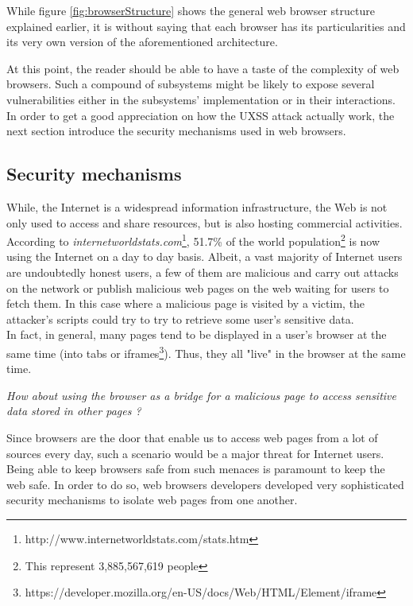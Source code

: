 \documentclass[journal]{IEEEtran}
\begin{document}
While figure \ref{fig:browserStructure} shows the general web browser structure explained earlier, it is without saying that each browser has its particularities and its very own version of the aforementioned architecture.

\medskip

At this point, the reader should be able to have a taste of the complexity of web browsers. Such a compound of subsystems might be likely to expose several vulnerabilities either in the subsystems' implementation or in their interactions. \\
In order to get a good appreciation on how the UXSS attack actually work, the next section introduce the security mechanisms used in web browsers.

\subsection{Security mechanisms}
While, the Internet is a widespread information infrastructure, the Web is not only used to access and share resources, but is also hosting commercial activities. According to \emph{internetworldstats.com}\footnote{http://www.internetworldstats.com/stats.htm}, 51.7\% of the world population\footnote{This represent 3,885,567,619 people} is now using the Internet on a day to day basis. Albeit, a vast majority of Internet users are undoubtedly honest users, a few of them are malicious and carry out attacks on the network or publish malicious web pages on the web waiting for users to fetch them. In this case where a malicious page is visited by a victim, the attacker's scripts could try to try to retrieve some user's sensitive data. \\
In fact, in general, many pages tend to be displayed in a user's browser at the same time (into tabs or iframes\footnote{https://developer.mozilla.org/en-US/docs/Web/HTML/Element/iframe}). Thus, they all "live" in the browser at the same time.

\medskip

\emph{How about using the browser as a bridge for a malicious page to access sensitive data stored in other pages ?}

\medskip

Since browsers are the door that enable us to access web pages from a lot of sources every day, such a scenario would be a major threat for Internet users. Being able to keep browsers safe from such menaces is paramount to keep the web safe. In order to do so, web browsers developers developed very sophisticated security mechanisms to isolate web pages from one another.
\end{document}
